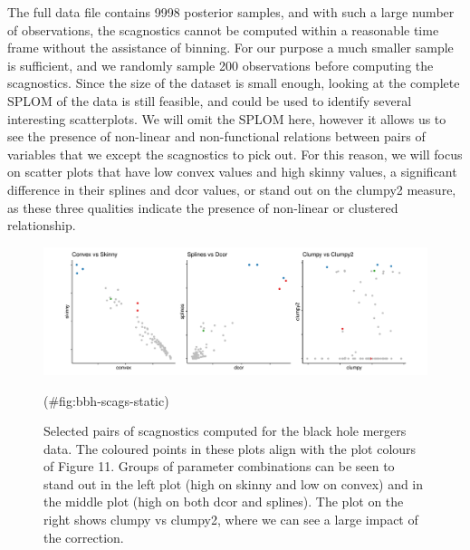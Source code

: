 The full data file contains 9998 posterior samples, and with such a
large number of observations, the scagnostics cannot be computed within
a reasonable time frame without the assistance of binning. For our
purpose a much smaller sample is sufficient, and we randomly sample 200
observations before computing the scagnostics. Since the size of the
dataset is small enough, looking at the complete SPLOM of the data is
still feasible, and could be used to identify several interesting
scatterplots. We will omit the SPLOM here, however it allows us to see
the presence of non-linear and non-functional relations between pairs of
variables that we except the scagnostics to pick out. For this reason,
we will focus on scatter plots that have low convex values and high
skinny values, a significant difference in their splines and dcor
values, or stand out on the clumpy2 measure, as these three qualities
indicate the presence of non-linear or clustered relationship.

\begin{Schunk}
\begin{figure}
\includegraphics[width=1\linewidth]{mason-lee-laa-cook_files/figure-latex/bbh-scags-static-1} \caption[Selected pairs of scagnostics computed for the black hole mergers data]{Selected pairs of scagnostics computed for the black hole mergers data. The coloured points in these plots align with the plot colours of Figure 11. Groups of parameter combinations can be seen to stand out in the left plot (high on skinny and low on convex) and in the middle plot (high on both dcor and splines). The plot on the right shows clumpy vs clumpy2, where we can see a large impact of the correction. }(\#fig:bbh-scags-static)
\end{figure}
\end{Schunk}

